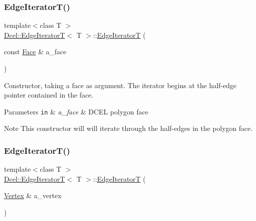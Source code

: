 \subsubsection{\texorpdfstring{Edge\+Iterator\+T()}{EdgeIteratorT()}\hspace{0.1cm}{\footnotesize\ttfamily [2/4]}}
{\footnotesize\ttfamily template$<$class T $>$ \\
\hyperlink{classDcel_1_1EdgeIteratorT}{Dcel\+::\+Edge\+IteratorT}$<$ T $>$\+::\hyperlink{classDcel_1_1EdgeIteratorT}{Edge\+IteratorT} (\begin{DoxyParamCaption}\item[{const \hyperlink{classDcel_1_1EdgeIteratorT_a59cc24c2a7a6a12c5c60bc04b0ac7497}{Face} \&}]{a\+\_\+face }\end{DoxyParamCaption})\hspace{0.3cm}{\ttfamily [inline]}}



Constructor, taking a face as argument. The iterator begins at the half-\/edge pointer contained in the face. 


\begin{DoxyParams}[1]{Parameters}
\mbox{\tt in}  & {\em a\+\_\+face} & D\+C\+EL polygon face \\
\hline
\end{DoxyParams}
\begin{DoxyNote}{Note}
This constructor will will iterate through the half-\/edges in the polygon face. 
\end{DoxyNote}
\mbox{\label{classDcel_1_1EdgeIteratorT_a0041cf8e8c4dcdda12a514aa64e295f7}} 
\subsubsection{\texorpdfstring{Edge\+Iterator\+T()}{EdgeIteratorT()}\hspace{0.1cm}{\footnotesize\ttfamily [3/4]}}
{\footnotesize\ttfamily template$<$class T $>$ \\
\hyperlink{classDcel_1_1EdgeIteratorT}{Dcel\+::\+Edge\+IteratorT}$<$ T $>$\+::\hyperlink{classDcel_1_1EdgeIteratorT}{Edge\+IteratorT} (\begin{DoxyParamCaption}\item[{\hyperlink{classDcel_1_1EdgeIteratorT_a4ca07f27da7faf50db5dbd1f20bbcafb}{Vertex} \&}]{a\+\_\+vertex }\end{DoxyParamCaption})\hspace{0.3cm}{\ttfamily [inline]}}




